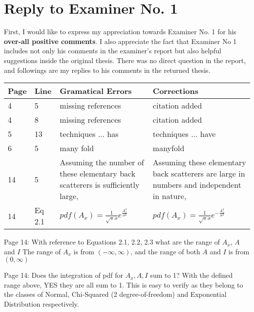 \section*{Reply to Examiner No. 1}

\begin{replyheader}
\end{replyheader}  

First, I would like to express my appreciation towards Examiner No. 1 for his \textbf{over-all positive comments}.
I also appreciate the fact that Examiner No 1 includes
  not only his comments in the examiner's report
  but also helpful suggestions inside the original thesis.
There was no direct question in the report, and followings are my replies to his comments in the returned thesis.

\noindent
\begin{longtable}[c]{p{}|p{}|p{}|p{}}
\textbf{Page} & \textbf{Line} & \textbf{Gramatical Errors} & \textbf{Corrections} \\
 \hline
\endhead
4 & 5 & missing references & citation added \\
4 & 8 & missing references & citation added \\
5 & 13 & techniques ... has & techniques ... have \\
6 & 5 & many fold & manyfold \\
14 & 5 & Assuming the number of these elementary back scatterers is sufficiently large, & Assuming these elementary back scatterers are large in numbers and independent in nature, \\
14 & Eq 2.1 & $pdf(A_x)=\frac{1}{\sqrt{\pi}\sigma} e^{\frac{A_x^2}{\sigma^2}}$ & $pdf(A_x)=\frac{1}{\sqrt{\pi}\sigma} e^{-\frac{A_x^2}{\sigma^2}}$ \\
\end{longtable}    

\replyToComment
    {Page 14: With reference to Equations 2.1, 2.2, 2.3 what are the range of $A_x$, $A$ and $I$}
    {The range of $A_x$ is from $(-\infty, \infty)$, and the range of both $A$ and $I$ is from $(0,\infty)$} 

\replyToComment
  {Page 14: Does the integration of pdf for $A_x,A,I$ sum to 1?}
  {With the defined range above, YES they are all sum to 1. This is easy to verify as they belong to the classes of Normal, Chi-Squared (2 degree-of-freedom) and Exponential Distribution respectively.}

